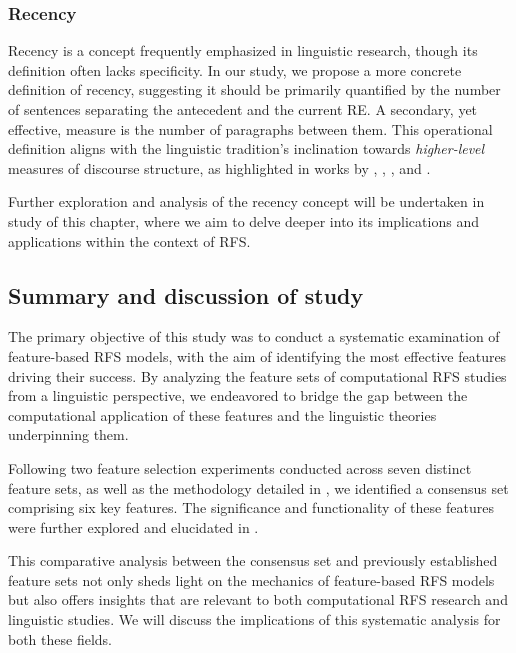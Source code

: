\subsubsection{Recency}

Recency is a concept frequently emphasized in linguistic research, though its definition often lacks specificity. In our study, we propose a more concrete definition of recency, suggesting it should be primarily quantified by the number of sentences separating the antecedent and the current RE. A secondary, yet effective, measure is the number of paragraphs between them. This operational definition aligns with the linguistic tradition's inclination towards \textit{higher-level} measures of discourse structure, as highlighted in works by \citet{Fox1987}, \citet{Tomlin1987}, \citet{henschel2000pronominalization}, and \citet{arnold2009reference}.

Further exploration and analysis of the recency concept will be undertaken in study \studC of this chapter, where we aim to delve deeper into its implications and applications within the context of RFS.

\subsection{Summary and discussion of study \studB}\label{sec:studybconc}

The primary objective of this study was to conduct a systematic examination of feature-based RFS models, with the aim of identifying the most effective features driving their success. By analyzing the feature sets of computational RFS studies from a linguistic perspective, we endeavored to bridge the gap between the computational application of these features and the linguistic theories underpinning them.

Following two feature selection experiments conducted across seven distinct feature sets, as well as the methodology detailed in , we identified a consensus set comprising six key features. The significance and functionality of these features were further explored and elucidated in .

This comparative analysis between the consensus set and previously established feature sets not only sheds light on the mechanics of feature-based RFS models but also offers insights that are relevant to both computational RFS research and linguistic studies. We will discuss the implications of this systematic analysis for both these fields.



